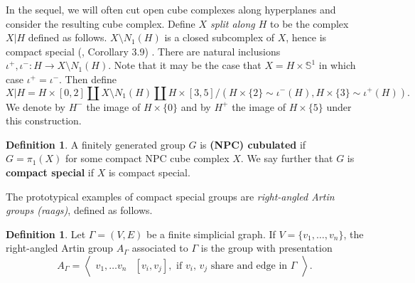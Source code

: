 \documentclass[11pt]{amsart}
\numberwithin{thm}{section}
\theoremstyle{remark}
\theoremstyle{definition}
\newtheorem{definition}[thm]{Definition}
\newcommand{\Sa}{\mathbb{S}}
\begin{document}
In the sequel, we will often cut open cube complexes along hyperplanes and consider the resulting cube complex. Define \emph{$X$ split along $H$} to be the complex $X|H$ defined as follows.  $X\setminus N_1(H)$ is a closed subcomplex of $X$, hence is compact special (\cite{HaWi08}, Corollary 3.9) .  There are natural inclusions $\iota^+,\iota^-:H\rightarrow X\setminus N_1(H)$. Note that it may be the case that $X=H\times \Sa^1$ in which case $\iota^+=\iota^-$. Then define \[X|H=H\times[0,2]\coprod X\setminus N_1(H)\coprod H\times[3,5]/\left(H\times \{2\}\sim\iota^-(H), H\times \{3\}\sim\iota^+(H)\right).\]
We denote by $H^-$ the image of $H\times\{0\}$ and by $H^+$ the image of $H\times\{5\}$ under this construction.

\begin{definition} A finitely generated group $G$ is \textbf{(NPC) cubulated} if $G=\pi_1(X)$ for some compact NPC cube complex $X$.  We say further that $G$ is \textbf{compact special} if $X$ is compact special. 
\end{definition}

The prototypical examples of compact special groups are \emph{right-angled Artin groups (raags)}, defined as follows.  
\begin{definition} Let $\Gamma=(V,E)$ be a finite simplicial graph.  If $V=\{v_1,\ldots,v_n\}$, the right-angled Artin group $A_\Gamma$ associated to $\Gamma$ is the group with presentation \[A_\Gamma=\left \langle\begin{array}{l|l} v_1,\ldots v_n & [v_i,v_j],\mbox{ if $v_i$, $v_j$ share and edge in $\Gamma$}\end{array}\right \rangle.\]
\end{definition}
\end{document}
